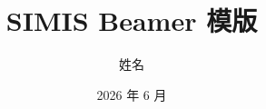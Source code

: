 \documentclass{ctexbeamer}
\title{SIMIS Beamer 模版}
\author{姓名}
\institute{SIMIS}
\date{2026 年 6 月}
\begin{document}
  
  \begin{frame}
    \maketitle
  \end{frame}
\end{document}
